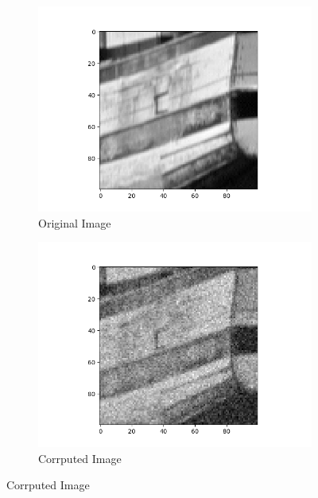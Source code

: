 \documentclass{article}
\begin{document}
  \begin{center}
    \begin{figure}[!htb]
      \begin{center}
        \begin{subfigure}[b]{0.3\textwidth}
          \includegraphics[width=\textwidth]{../report_images/boat_plot.png}
          \caption{Original Image}
        \end{subfigure}
        \hfill
        \begin{subfigure}[b]{0.3\textwidth}
          \includegraphics[width=\textwidth]{../report_images/noisy_boat_plot.png}
          \caption{Corrputed Image}
        \end{subfigure}
        \hfill

\end{center}
\end{figure}
\end{center}
\end{document}
